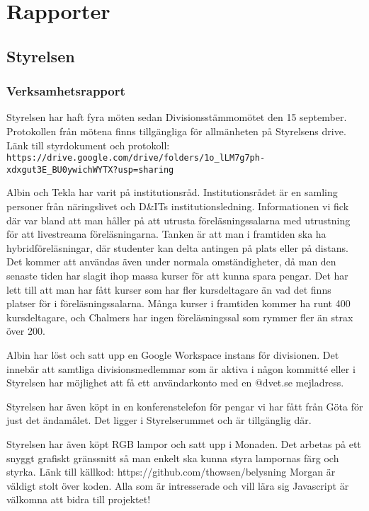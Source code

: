 \documentclass[protokoll]{dvd}
\begin{document}
\newpage

\section{Rapporter}

\subsection{Styrelsen}

\subsubsection{Verksamhetsrapport}

Styrelsen har haft fyra möten sedan Divisionsstämmomötet den 15 september.
Protokollen från mötena finns tillgängliga för allmänheten på Styrelsens drive.
Länk till styrdokument och protokoll: \verb|https://drive.google.com/drive/folders/1o_lLM7g7ph-xdxgut3E_BU0ywichWYTX?usp=sharing|

Albin och Tekla har varit på institutionsråd.
Institutionsrådet är en samling personer från näringslivet och D\&ITs institutionsledning.
Informationen vi fick där var bland att man håller på att utrusta föreläsningssalarna med utrustning för att livestreama föreläsningarna.
Tanken är att man i framtiden ska ha hybridföreläsningar, där studenter kan delta antingen på plats eller på distans.
Det kommer att användas även under normala omständigheter, då man den senaste tiden har slagit ihop massa kurser för att kunna spara pengar.
Det har lett till att man har fått kurser som har fler kursdeltagare än vad det finns platser för i föreläsningssalarna.
Många kurser i framtiden kommer ha runt 400 kursdeltagare, och Chalmers har ingen föreläsningssal som rymmer fler än strax över 200.

Albin har löst och satt upp en Google Workspace instans för divisionen.
Det innebär att samtliga divisionsmedlemmar som är aktiva i någon kommitté eller i Styrelsen har möjlighet att få ett användarkonto med en @dvet.se mejladress.

Styrelsen har även köpt in en konferenstelefon för pengar vi har fått från Göta för just det ändamålet.
Det ligger i Styrelserummet och är tillgänglig där.

Styrelsen har även köpt RGB lampor och satt upp i Monaden.
Det arbetas på ett snyggt grafiskt gränssnitt så man enkelt ska kunna styra lampornas färg och styrka.
Länk till källkod: https://github.com/thowsen/belysning
Morgan är väldigt stolt över koden.
Alla som är intresserade och vill lära sig Javascript är välkomna att bidra till projektet!
\end{document}
